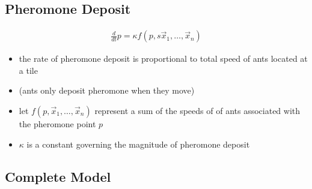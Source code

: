 \subsection{Pheromone Deposit}
\begin{align*}
\frac{d}{dt} p = \kappa f(p,s\vec{x}_1,\hdots,\vec{x}_n)
\end{align*}
\begin{itemize}
	\item the rate of pheromone deposit is proportional to total speed of ants located at a tile
    \item (ants only deposit pheromone when they move)
    \item let $f(p, \vec{x}_1,\hdots,\vec{x}_n)$ represent a sum of the speeds of of ants associated with the pheromone point $p$
    \item $\kappa$ is a constant governing the magnitude of pheromone deposit
\end{itemize}

\subsection{Complete Model}

